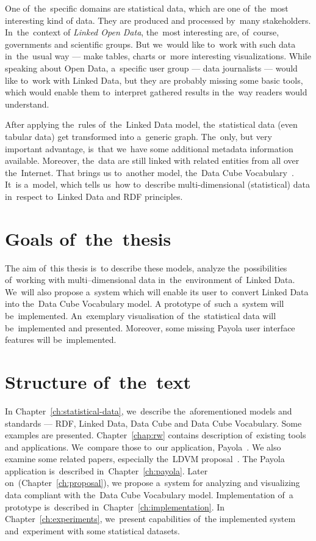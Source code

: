 One of~the~specific domains are statistical data, which are one of~the~most interesting kind
of data. They are produced and processed by~many stakeholders. In~the~context of
\emph{Linked Open Data}, the~most interesting are, of~course, governments and scientific groups.
But we~would like to~work with such data in~the~usual
way --- make tables, charts or~more interesting visualizations. While speaking about Open Data, a~specific
user group --- data journalists --- would like to~work with Linked Data, but they are probably
missing some basic tools, which would enable them to~interpret gathered results
in the~way readers would understand.

After applying the~rules of~the~Linked Data model, the~statistical data (even tabular data)
get transformed into a~generic graph. The~only, but very important advantage, is~that we~have some additional
metadata information available. Moreover, the~data are still linked with related entities from all over the~Internet.
That brings
us to~another model, the~Data Cube Vocabulary~\cite{dcv}. It~is a~model, which tells us~how to~describe
multi-dimensional (statistical) data in~respect to~Linked Data and RDF 
principles.

\section*{Goals of~the~thesis}

The aim of~this thesis is~to describe these models, analyze the~possibilities of~working
with multi--dimensional data in~the~environment of~Linked Data. We~will also propose a~system
which will enable its user to~convert Linked Data into the~Data Cube Vocabulary model.
A prototype of~such a~system will be~implemented. An~exemplary visualisation of~the~statistical
data will be~implemented and presented. Moreover, some missing Payola user interface features 
will be~implemented.

\section*{Structure of~the~text}
In Chapter~\ref{ch:statistical-data}, we~describe the~aforementioned 
models and standards --- RDF, Linked Data, Data Cube and Data Cube Vocabulary. 
Some examples are presented. Chapter~\ref{chap:rw} contains description of~existing tools and applications. We~compare those to~our application, Payola~\cite{payola}.
We also examine some related papers, especially the~LDVM proposal~\cite{ldvm}. 
The Payola application is~described in~Chapter~\ref{ch:payola}. Later on~(Chapter~\ref{ch:proposal}),
we propose a~system
for analyzing and visualizing data compliant with the~Data Cube Vocabulary model.
Implementation of~a prototype is~described in~Chapter~\ref{ch:implementation}.
In Chapter~\ref{ch:experiments}, we~present capabilities of~the implemented system
and~experiment with some statistical datasets.